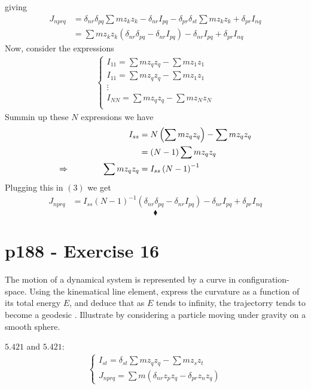 giving 
\begin{align}
J_{nprq}& =  \delta_{nr} \delta_{pq}\sum m z_k z_k-\delta_{nr}I_{pq} - \delta_{pr} \delta_{st}\sum m z_k z_k+\delta_{pr}I_{nq} \\
&= \sum m z_k z_k\left( \delta_{nr} \delta_{pq}- \delta_{nr}I_{pq}\right)-\delta_{nr}I_{pq} +\delta_{pr}I_{nq}
\end{align}
Now, consider the expressions 
\begin{align}
\left\{\begin{array}{l}
I_{11}= \sum m z_q z_q - \sum m z_1 z_1\\
I_{11}= \sum m z_q z_q - \sum m z_1 z_1\\
\vdots\\
I_{NN} = \sum m z_q z_q - \sum m z_N z_N\\
\end{array}\right.
\end{align}
Summin up these $N$ expressions we have
\begin{align}
I_{ss} &= N\left( \sum m z_q z_q \right) - \sum m z_q z_q\\
&= \left( N-1  \right)\sum m z_q z_q \\
\Rightarrow\quad\quad\quad\quad \sum m z_q z_q &= I_{ss} \left( N-1  \right)^{-1}
\end{align}
Plugging this in $(3)$ we get
\begin{align}
J_{nprq}
&= I_{ss} \left( N-1  \right)^{-1}\left( \delta_{nr} \delta_{pq}- \delta_{nr}I_{pq}\right)-\delta_{nr}I_{pq} +\delta_{pr}I_{nq}
\end{align}
$$\blacklozenge$$
\newpage


\section{p188 - Exercise 16}
\begin{tcolorbox}
The motion of a dynamical system is represented by a curve in configuration-space. Using the kinematical line element, express the curvature as a function of its total energy $E$, and deduce that as $E$ tends to infinity, the trajectorry tends to become a geodesic . Illustrate by considering a particle moving under gravity on a smooth sphere.
\end{tcolorbox} 
$\mathbf{5.421}$ and $\mathbf{5.421}$:
\begin{align}
\left\{\begin{array}{l}
I_{st}= \delta_{st}\sum m z_q z_q - \sum m z_s z_t\\
J_{nprq} = \sum m \left( \delta_{nr} z_p z_q - \delta_{pr} z_n z_q \right)
\end{array}\right.
\end{align}

